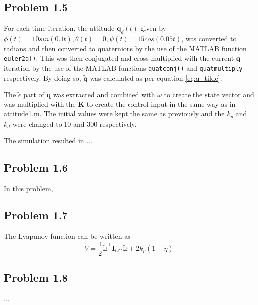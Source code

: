 

\subsection*{Problem 1.5}
For each time iteration, the attitude $\mathbf{q}_d(t)$ given by $\phi(t) = 10sin(0.1t), \theta(t) = 0, \psi(t) = 15cos(0.05t)$, was converted to radians and then converted to quaternions by the use of the MATLAB function \texttt{euler2q()}. This was then conjugated and cross multiplied with the current $\mathbf{q}$ iteration by the use of the MATLAB functions \texttt{quatconj()} and \texttt{quatmultiply} respectively. By doing so, $\mathbf{\tilde{q}}$ was calculated as per equation \eqref{eq:q_tilde}.

The $\tilde{\epsilon}$ part of $\mathbf{\tilde{q}}$ was extracted and combined with $\omega$ to create the state vector and was multiplied with the $\mathbf{K}$ to create the control input in the same way as in {\color{blue} attitude1.m}. The initial values were kept the same as previously and the $k_p$ and $k_d$ were changed to 10 and 300 respectively. 

The simulation resulted in ...

\subsection*{Problem 1.6}

In this problem, \tilde{\mathbf{\omega}} 

\subsection*{Problem 1.7}
The Lyapunov function can be written as 
 \begin{equation}
	 V = \frac{1}{2} \tilde{\boldsymbol{\omega}}^{\top} \mathbf{I}_{CG}\tilde{\boldsymbol{\omega}} + 2 k_p (1-\tilde{\eta})
 \end{equation}

\subsection*{Problem 1.8}
...


